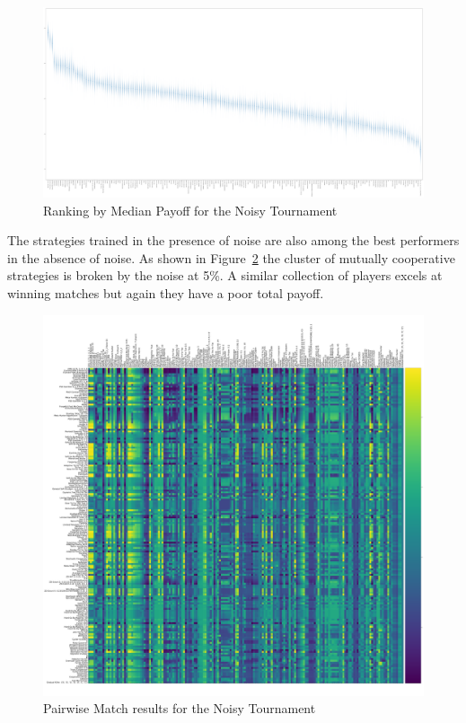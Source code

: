 \documentclass{article}
\begin{document}
\begin{landscape}
    \begin{figure}[!hbtp]
        \includegraphics[width=\paperwidth]{./assets/noisy_scores_boxplots.pdf}
        \caption{Ranking by Median Payoff for the Noisy Tournament}
        \label{fig:noisy_score}
    \end{figure}
\end{landscape}


The strategies trained in the presence of noise are also among the best
performers in the absence of noise. As shown in Figure~\ref{fig:noisy_heatmap}
the cluster of mutually cooperative strategies is broken by the noise at 5\%. A
similar collection of players excels at winning matches but again they have a
poor total payoff.

\begin{figure}[!hbtp]
    \includegraphics[width=\textwidth]{./assets/noisy_scores_heatmap.pdf}
    \caption{Pairwise Match results for the Noisy Tournament}
    \label{fig:noisy_heatmap}
\end{figure}
\end{document}
